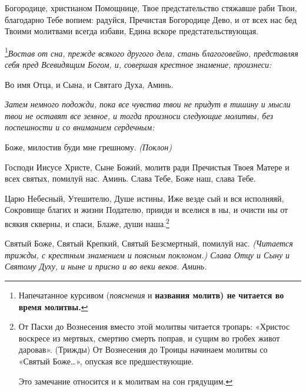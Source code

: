 

Богородице, христианом Помощнице, Твое предстательство стяжавше раби Твои, благодарно Тебе вопием: радуйся, Пречистая Богородице Дево, и от всех нас бед Твоими молитвами всегда избави, Едина вскоре предстательствующая.
\mychapterending

 

\footnote{Напечатанное курсивом (\emph{пояснения} и \bfseries названия молитв\normalfont{}) не читается во время молитвы.}\itshape  Востав от сна, прежде всякого другого дела, стань благоговейно, представляя себя пред Всевидящим Богом, и, совершая крестное знамение, произнеси:\normalfont{}


Во имя Отца, и Сына, и Святаго Духа, Аминь.




\medskip\itshape Затем немного подожди, пока все чувства твои не придут в тишину и мысли твои не оставят все земное, и тогда произноси следующие молитвы, без поспешности и со вниманием сердечным:\normalfont{}



Боже, милостив буди мне грешному. \itshape (Поклон)\normalfont{}




Господи Иисусе Христе, Сыне Божий, молитв ради Пречистыя Твоея Матере и всех святых, помилуй нас. Аминь.
Слава Тебе, Боже наш, слава Тебе.






Царю Небесный, Утешителю, Душе истины, Иже везде сый и вся исполняяй, Сокровище благих и жизни Подателю, прииди и вселися в ны, и очисти ны от всякия скверны, и спаси, Блаже, души наша.\footnote{От Пасхи до Вознесения вместо этой молитвы читается тропарь: «Христос воскресе из мертвых, смертию смерть поправ, и сущим во гробех живот даровав». (Трижды) От Вознесения до Троицы начинаем молитвы со «Святый Боже…», опуская все предшествующие. 

Это замечание относится и к молитвам на сон грядущим.
}




Святый Боже, Святый Крепкий, Святый Безсмертный, помилуй нас. \itshape (Читается трижды, с крестным знамением и поясным поклоном.) \normalfont{}
Слава Отцу и Сыну и Святому Духу, и ныне и присно и во веки веков. Аминь.




